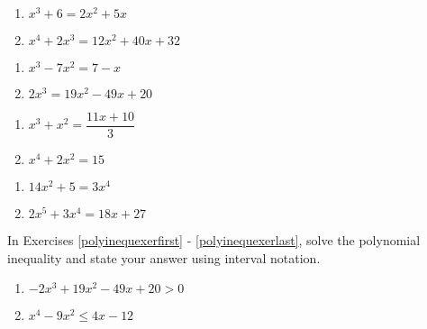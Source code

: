 \begin{multicols}{2}
\begin{enumerate}
\setcounter{enumi}{\value{HW}}

\item $x^{3} + 6 = 2x^{2} + 5x$ 
\item $x^{4} + 2x^{3} = 12x^{2} + 40x + 32$ 

\setcounter{HW}{\value{enumi}}
\end{enumerate}
\end{multicols}


\begin{multicols}{2}
\begin{enumerate}
\setcounter{enumi}{\value{HW}}

\item $x^{3} - 7x^{2} = 7-x$ 
\item $2x^{3} = 19x^{2} - 49x + 20$ 

\setcounter{HW}{\value{enumi}}
\end{enumerate}
\end{multicols}

\begin{multicols}{2}
\begin{enumerate}
\setcounter{enumi}{\value{HW}}

\item $x^{3} + x^{2} = \dfrac{11x + 10}{3}$ 
\item $x^4+2x^2 = 15$ 


\setcounter{HW}{\value{enumi}}
\end{enumerate}
\end{multicols}

\begin{multicols}{2}
\begin{enumerate}
\setcounter{enumi}{\value{HW}}

\item $14x^{2}+5=3x^{4}$  

\item $2x^5+3x^4 = 18x + 27$ \label{polyequexerlast}  

\setcounter{HW}{\value{enumi}}
\end{enumerate}
\end{multicols}


In Exercises \ref{polyinequexerfirst} - \ref{polyinequexerlast}, solve the polynomial inequality and state your answer using interval notation.



\begin{multicols}{2}
\begin{enumerate}
\setcounter{enumi}{\value{HW}}

\item $-2x^{3} + 19x^{2} - 49x + 20 > 0$ \label{polyinequexerfirst}
\item $x^{4} - 9x^{2} \leq 4x - 12$

\setcounter{HW}{\value{enumi}}
\end{enumerate}
\end{multicols}


